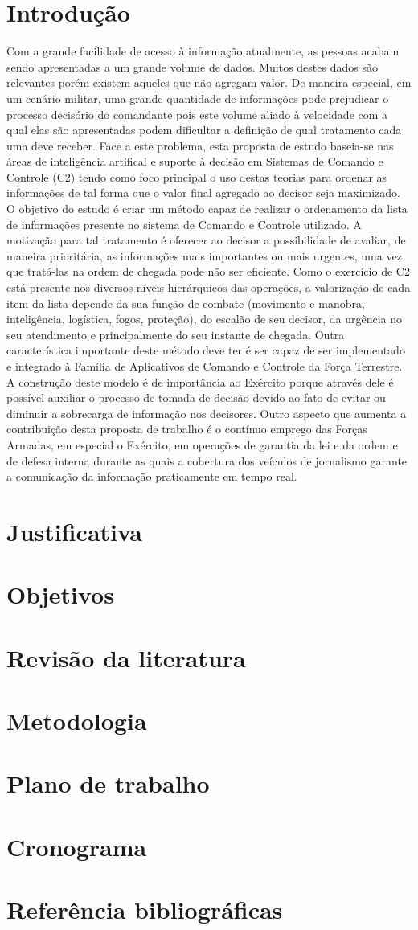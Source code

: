 \documentclass[a4paper,12pt]{article}
\begin{document}
\section{Introdução}
Com a grande facilidade de acesso à informação atualmente, as pessoas acabam sendo apresentadas a um grande volume de dados. 
Muitos destes dados são relevantes porém existem aqueles que não agregam valor. 
De maneira especial, em um cenário militar, uma grande quantidade de informações pode prejudicar o processo decisório do 
comandante pois este volume aliado à velocidade com a qual elas são apresentadas podem dificultar a definição de qual 
tratamento cada uma deve receber.
Face a este problema, esta proposta de estudo baseia-se nas áreas de inteligência artifical e suporte à decisão em Sistemas 
de Comando e Controle (C2) tendo como foco principal o uso destas teorias para ordenar as informações de tal forma que o 
valor final agregado ao decisor seja maximizado.
O objetivo do estudo é criar um método capaz de realizar o ordenamento da lista de informações presente no sistema de 
Comando e Controle utilizado. A motivação para tal tratamento é oferecer ao decisor a possibilidade de avaliar, de maneira 
prioritária, as informações mais importantes ou mais urgentes, uma vez que tratá-las na ordem de chegada pode não ser 
eficiente. Como o exercício de C2 está presente nos diversos níveis hierárquicos das operações, a valorização de cada item 
da lista depende da sua função de combate (movimento e manobra, inteligência, logística, fogos, proteção), do escalão de seu 
decisor, da urgência no seu atendimento e principalmente do seu instante de chegada. Outra característica importante deste 
método deve ter é ser capaz de ser implementado e integrado à Família de Aplicativos de Comando e Controle da Força 
Terrestre.
A construção deste modelo é de importância ao Exército porque através dele é possível auxiliar o processo de tomada de 
decisão devido ao fato de evitar ou diminuir a sobrecarga de informação nos decisores. Outro aspecto que aumenta a 
contribuição desta proposta de trabalho é o contínuo emprego das Forças Armadas, em especial o Exército, em operações de 
garantia da lei e da ordem e de defesa interna durante as quais a cobertura dos veículos de jornalismo garante a comunicação
da informação praticamente em tempo real.

\section{Justificativa}
\section{Objetivos}
\section{Revisão da literatura}
\section{Metodologia}
\section{Plano de trabalho}
\section{Cronograma}
\section{Referência bibliográficas}
\end{document}
